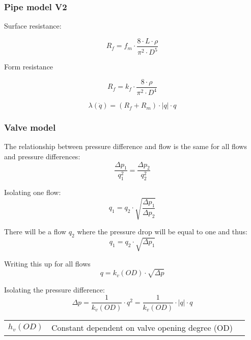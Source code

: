 \documentclass{article}
\begin{document}
	
	\subsubsection{Pipe model V2}
	
	Surface resistance:
	
	\begin{equation}
		R_f = f_m \cdot \frac{8 \cdot L \cdot \rho}{\pi^2 \cdot D^5}
	\end{equation}
	
	Form resistance
	
	\begin{equation}
		R_f = k_f \cdot \frac{8 \cdot \rho}{\pi^2 \cdot D^4}
	\end{equation}
	
	
	\begin{equation}
		\lambda (\dot q) = (R_f + R_m) \cdot |q| \cdot q
	\end{equation}


\subsubsection{Valve model}

The relationship between pressure difference and flow is the same for all flows and pressure differences:
\begin{equation}
	\frac{\Delta p_1}{q_1^2} = \frac{\Delta p_2}{q_2^2}
\end{equation}

Isolating one flow:
\begin{equation}
	q_1 = q_2 \cdot \sqrt{\frac{\Delta p_1}{\Delta p_2}}
\end{equation}

There will be a flow $q_2$ where the pressure drop will be equal to one and thus:
\begin{equation}
	q_1 = q_2 \cdot \sqrt{\Delta p_1}
\end{equation}

Writing this up for all flows
\begin{equation}
	q = k_v(OD) \cdot \sqrt{\Delta p}
\end{equation}

Isolating the pressure difference:
\begin{equation}
	\Delta p = \frac{1}{k_v(OD)} \cdot q^2 = \frac{1}{k_v(OD)} \cdot |q| \cdot q
\end{equation}

\begin{center}
	\begin{tabular}{l p{8cm} l}
		$h_v(OD)$ & Constant dependent on valve opening degree (OD) \\
	\end{tabular}
\end{center}
\end{document}
